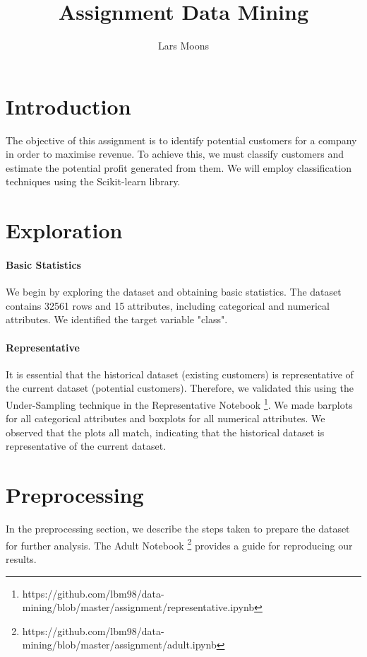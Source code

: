 \documentclass[twocolumn]{article}
\title{Assignment Data Mining}
\author{Lars Moons}
\begin{document}
\maketitle

\section{Introduction}

    The objective of this assignment is to identify potential customers for a company in order to maximise revenue. To achieve this, we must classify customers and estimate the potential profit generated from them. We will employ classification techniques using the Scikit-learn library.

\section{Exploration}

    \paragraph{Basic Statistics}
    We begin by exploring the dataset and obtaining basic statistics.
    The dataset contains 32561 rows and 15 attributes,
    including categorical and numerical attributes.
    We identified the target variable "class".

    \paragraph{Representative}
    It is essential that the historical dataset (existing customers)
    is representative of the current dataset (potential customers).
    Therefore, we validated this using the Under-Sampling technique in the Representative Notebook
    \footnote{https://github.com/lbm98/data-mining/blob/master/assignment/representative.ipynb}.
    We made barplots for all categorical attributes
    and boxplots for all numerical attributes.
    We observed that the plots all match,
    indicating that the historical dataset is representative of the current dataset.
    

\section{Preprocessing}
    In the preprocessing section, we describe the steps taken
    to prepare the dataset for further analysis.
    The Adult Notebook
    \footnote{https://github.com/lbm98/data-mining/blob/master/assignment/adult.ipynb}
    provides a guide for reproducing our results.
\end{document}
